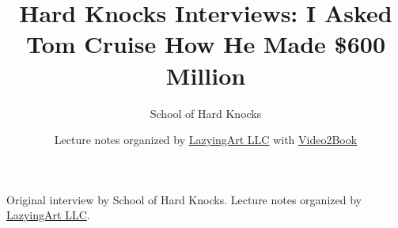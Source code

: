\documentclass[11pt,oneside]{book}
\begin{document}
\frontmatter
\title{Hard Knocks Interviews: I Asked Tom Cruise How He Made \$600 Million}
\author{School of Hard Knocks}
\date{Lecture notes organized by \href{https://lazying.art}{LazyingArt LLC} with \href{https://github.com/lachlanchen/Video2Book}{Video2Book}}
\maketitle
\begin{center}
\small Original interview by School of Hard Knocks. Lecture notes organized by \href{https://lazying.art}{LazyingArt LLC}.
\end{center}
\clearpage
\mainmatter

\end{document}
